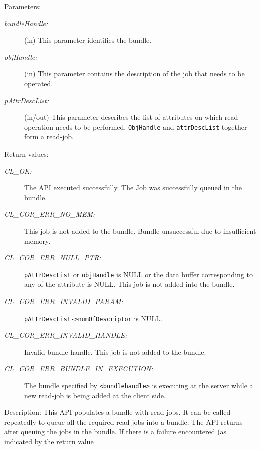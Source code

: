 \begin{flushleft}
\begin{Desc}
\begin{verbatim}
\end{verbatim}
\normalsize
\end{Desc}
\begin{Desc}
\item[Parameters:]
\begin{description}
\item[{\em bundle\-Handle:}](in) This parameter identifies the bundle.
\item[{\em obj\-Handle:}](in) This parameter contains the description of the job that needs to be operated.
\item[{\em p\-Attr\-Desc\-List:}](in/out) This parameter describes the list of attributes on which read operation needs to be performed. {\tt{ObjHandle}}
and {\tt{attrDescList}} together form a read-job.
\end{description}
\end{Desc}
\begin{Desc}
\item[Return values:]
\begin{description}
\item[{\em CL\_\-OK:}] The API executed successfully. The Job was successfully queued in the bundle.
\item[{\em CL\_\-COR\_\-ERR\_\-NO\_\-MEM:}] This job is not added to the bundle. Bundle unsuccessful due to insufficient memory. 
\item[{\em CL\_\-COR\_\-ERR\_\-NULL\_\-PTR:}] {\tt{pAttrDescList}} or {\tt{objHandle}} is NULL or the data buffer corresponding to any of the attribute 
is NULL. This job is not added into the bundle.
\item[{\em CL\_\-COR\_\-ERR\_\-INVALID\_\-PARAM:}] {\tt{pAttrDescList->numOfDescriptor}} is NULL.
\item[{\em CL\_\-COR\_\-ERR\_\-INVALID\_\-HANDLE:}] Invalid bundle handle. This job is not added to the bundle.
\item[{\em CL\_\-COR\_\-ERR\_\-BUNDLE\_\-IN\_\-EXECUTION:}] The bundle specified by {\tt{<bundlehandle>}} is executing at the server while a new read-job 
is being added at the client side.
\end{description}
\end{Desc}
\begin{Desc}
\item[Description:] This API populates a bundle with read-jobs. It can be called repeatedly to queue all the required read-jobs into a 
bundle.
The API returns after queuing the jobs in the bundle. If there is a failure encountered (as indicated by the return value 

\end{Desc}
\end{flushleft}
